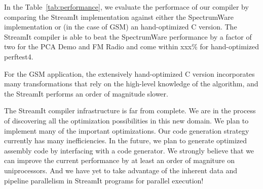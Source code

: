 



In the Table~\ref{tab:performance}, we evaluate the performace of our
compiler by comparing the StreamIt implementation against either the
SpectrumWare implementation or (in the case of GSM) an hand-optimized
C version.
The StreamIt compiler is able to beat the SpectrumWare performance by
a factor of two for the PCA Demo and FM Radio and come within xxx\%
for hand-optimized perftest4.

For the GSM application, the extensively hand-optimized C version
incorporates many transformations that rely on the high-level
knowledge of the algorithm, and the StreamIt performs an order of
magnitude slower.

The StreamIt compiler infrastructure is far from complete. We are in
the process of discovering all the optimization possibilities in this
new domain.  We plan to implement many of the important optimizations.
Our code generation strategy currently has many inefficiencies. In the
future, we plan to generate optimized assembly code by interfacing
with a code generator.  We strongly believe that we can improve the
current performance by at least an order of magniture on
uniprocessors. And we have yet to take advantage of the inherent data
and pipeline parallelism in StreamIt programs for parallel execution!

